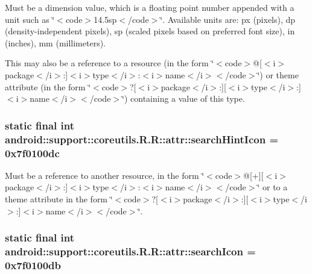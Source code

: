 Must be a dimension value, which is a floating point number appended with a unit such as \char`\"{}$<$code$>$14.5sp$<$/code$>$\char`\"{}. Available units are: px (pixels), dp (density-independent pixels), sp (scaled pixels based on preferred font size), in (inches), mm (millimeters). 

This may also be a reference to a resource (in the form \char`\"{}$<$code$>$@\mbox{[}$<$i$>$package$<$/i$>$:\mbox{]}$<$i$>$type$<$/i$>$:$<$i$>$name$<$/i$>$$<$/code$>$\char`\"{}) or theme attribute (in the form \char`\"{}$<$code$>$?\mbox{[}$<$i$>$package$<$/i$>$:\mbox{]}\mbox{[}$<$i$>$type$<$/i$>$:\mbox{]}$<$i$>$name$<$/i$>$$<$/code$>$\char`\"{}) containing a value of this type. \hypertarget{classandroid_1_1support_1_1coreutils_1_1_r_1_1attr_75edf9733f5476d0455dd68bb1e8598e}{
\subsubsection[{searchHintIcon}]{\setlength{\rightskip}{0pt plus 5cm}static final int android::support::coreutils.R.R::attr::searchHintIcon = 0x7f0100dc}}
\label{classandroid_1_1support_1_1coreutils_1_1_r_1_1attr_75edf9733f5476d0455dd68bb1e8598e}


Must be a reference to another resource, in the form \char`\"{}$<$code$>$@\mbox{[}+\mbox{]}\mbox{[}$<$i$>$package$<$/i$>$:\mbox{]}$<$i$>$type$<$/i$>$:$<$i$>$name$<$/i$>$$<$/code$>$\char`\"{} or to a theme attribute in the form \char`\"{}$<$code$>$?\mbox{[}$<$i$>$package$<$/i$>$:\mbox{]}\mbox{[}$<$i$>$type$<$/i$>$:\mbox{]}$<$i$>$name$<$/i$>$$<$/code$>$\char`\"{}. \hypertarget{classandroid_1_1support_1_1coreutils_1_1_r_1_1attr_3f2c12bf4c5fd1c5e395066e24a99dea}{
\subsubsection[{searchIcon}]{\setlength{\rightskip}{0pt plus 5cm}static final int android::support::coreutils.R.R::attr::searchIcon = 0x7f0100db}}
\label{classandroid_1_1support_1_1coreutils_1_1_r_1_1attr_3f2c12bf4c5fd1c5e395066e24a99dea}


